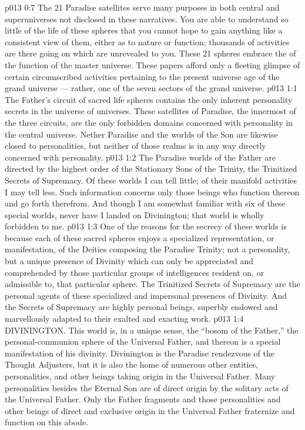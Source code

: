 \vs p013 0:7 The 21 Paradise satellites serve many purposes in both central and superuniverses not disclosed in these narratives. You are able to understand so little of the life of these spheres that you cannot hope to gain anything like a consistent view of them, either as to nature or function; thousands of activities are there going on which are unrevealed to you. These 21 spheres embrace the  of the function of the master universe. These papers afford only a fleeting glimpse of certain circumscribed activities pertaining to the present universe age of the grand universe --- rather, one of the seven sectors of the grand universe.
\vs p013 1:1 The Father’s circuit of sacred life spheres contains the only inherent personality secrets in the universe of universes. These satellites of Paradise, the innermost of the three circuits, are the only forbidden domains concerned with personality in the central universe. Nether Paradise and the worlds of the Son are likewise closed to personalities, but neither of those realms is in any way directly concerned with personality.
\vs p013 1:2 The Paradise worlds of the Father are directed by the highest order of the Stationary Sons of the Trinity, the Trinitized Secrets of Supremacy. Of these worlds I can tell little; of their manifold activities I may tell less. Such information concerns only those beings who function thereon and go forth therefrom. And though I am somewhat familiar with six of these special worlds, never have I landed on Divinington; that world is wholly forbidden to me.
\vs p013 1:3 One of the reasons for the secrecy of these worlds is because each of these sacred spheres enjoys a specialized representation, or manifestation, of the Deities composing the Paradise Trinity; not a personality, but a unique presence of Divinity which can only be appreciated and comprehended by those particular groups of intelligences resident on, or admissible to, that particular sphere. The Trinitized Secrets of Supremacy are the personal agents of these specialized and impersonal presences of Divinity. And the Secrets of Supremacy are highly personal beings, superbly endowed and marvellously adapted to their exalted and exacting work.
\vs p013 1:4 \bibnobreakspace DIVININGTON. This world is, in a unique sense, the “bosom of the Father,” the personal\hyp{}communion sphere of the Universal Father, and thereon is a special manifestation of his divinity. Divinington is the Paradise rendezvous of the Thought Adjusters, but it is also the home of numerous other entities, personalities, and other beings taking origin in the Universal Father. Many personalities besides the Eternal Son are of direct origin by the solitary acts of the Universal Father. Only the Father fragments and those personalities and other beings of direct and exclusive origin in the Universal Father fraternize and function on this abode.

